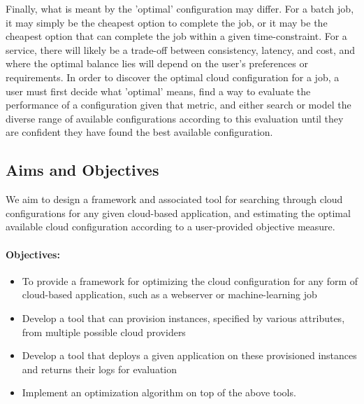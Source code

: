 \documentclass{article}
\begin{document}
Finally, what is meant by the 'optimal' configuration may differ. For a batch job, it may simply be the cheapest option to complete the job, or it may be the cheapest option that can complete the job within a given time-constraint. For a service, there will likely be a trade-off between consistency, latency, and cost, and where the optimal balance lies will depend on the user's preferences or requirements.
In order to discover the optimal cloud configuration for a job, a user must first decide what 'optimal' means, find a way to evaluate the performance of a configuration given that metric, and either search or model the diverse range of available configurations according to this evaluation until they are confident they have found the best available configuration.

\subsection{Aims and Objectives}
We aim to design a framework and associated tool for searching through cloud configurations for any given cloud-based application, and estimating the optimal available cloud configuration according to a user-provided objective measure.
\paragraph{Objectives:}
\begin{itemize}
\item To provide a framework for optimizing the cloud configuration for any form of cloud-based application, such as a webserver or machine-learning job
\item Develop a tool that can provision instances, specified by various attributes, from multiple possible cloud providers
\item Develop a tool that deploys a given application on these provisioned instances and returns their logs for evaluation
\item Implement an optimization algorithm on top of the above tools.
\end{itemize}
\end{document}

